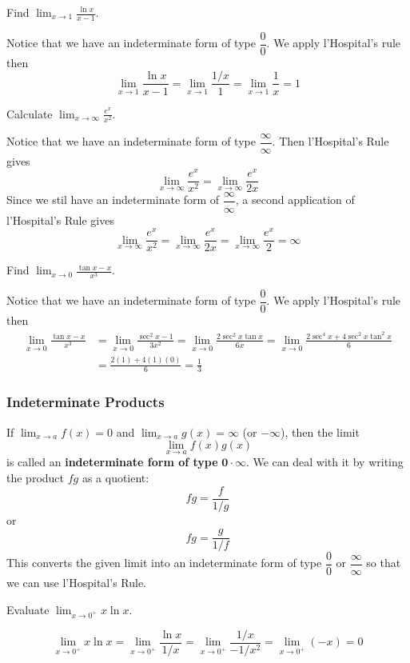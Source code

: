 \begin{problem}
    Find \(\displaystyle{\lim_{x\to 1}\frac{\ln x}{x-1}}\).
\end{problem}
\begin{solution}
    Notice that we have an indeterminate form of type \(\dfrac{0}{0}\).
    We apply l'Hospital's rule then
    \[\lim_{x\to 1}\dfrac{\ln x}{x-1}=\lim_{x\to 1}\frac{1/x}{1}
    =\lim_{x\to 1}\frac{1}{x}=1\]
\end{solution}
\begin{problem}
    Calculate \(\displaystyle{\lim_{x\to\infty}\frac{e^x}{x^2}}\).
\end{problem}
\begin{solution}
    Notice that we have an indeterminate form of type
    \(\dfrac{\infty}{\infty}\).
    Then l'Hospital's Rule gives
    \[\lim_{x\to\infty}\frac{e^x}{x^2}=\lim_{x\to\infty}\frac{e^x}{2x}\]
    Since we stil have an indeterminate form of \(\dfrac{\infty}{\infty}\), a
    second application of l'Hospital's Rule gives
    \[\lim_{x\to\infty}\frac{e^x}{x^2}=\lim_{x\to\infty}\frac{e^x}{2x}
    =\lim_{x\to\infty}\frac{e^x}{2}=\infty\]
\end{solution}
\begin{problem}
    Find \(\displaystyle{\lim_{x\to 0}\frac{\tan x-x}{x^3}}\).
\end{problem}
\begin{solution}
    Notice that we have an indeterminate form of type \(\dfrac{0}{0}\).
    We apply l'Hospital's rule then
    \begin{align*}
        \lim_{x\to 0}\frac{\tan x-x}{x^3}
        &= \lim_{x\to 0}\frac{\sec^2 x-1}{3x^2}
        =\lim_{x\to 0}\frac{2\sec^2 x\tan x}{6x}
        =\lim_{x\to 0}\frac{2\sec^4 x+4\sec^2 x\tan^2 x}{6} \\
        &= \frac{2(1)+4(1)(0)}{6}=\frac{1}{3}
    \end{align*}
\end{solution}

\subsubsection*{Indeterminate Products}
If \(\displaystyle{\lim_{x\to a}f(x)=0}\) and
\(\displaystyle{\lim_{x\to a}g(x)=\infty}\) (or \(-\infty\)),
then the limit
\[\lim_{x\to a}f(x)g(x)\]
is called an \textbf{indeterminate form of type} \(\mathbf{0\cdot\infty}\).
We can deal with it by writing the product \(fg\) as a quotient:
\[fg=\frac{f}{1/g}\]
or
\[fg=\frac{g}{1/f}\]
This converts the given limit into an indeterminate form of type
\(\dfrac{0}{0}\) or \(\dfrac{\infty}{\infty}\) so that we can use l'Hospital's
Rule.
\begin{problem}
    Evaluate \(\displaystyle{\lim_{x\to 0^+}x\ln x}\).
\end{problem}
\begin{solution}

    \[\lim_{x\to 0^+}x\ln x=\lim_{x\to 0^+}\frac{\ln x}{1/x}
    =\lim_{x\to 0^+}\frac{1/x}{-1/x^2}=\lim_{x\to 0^+}(-x)=0\]
\end{solution}

